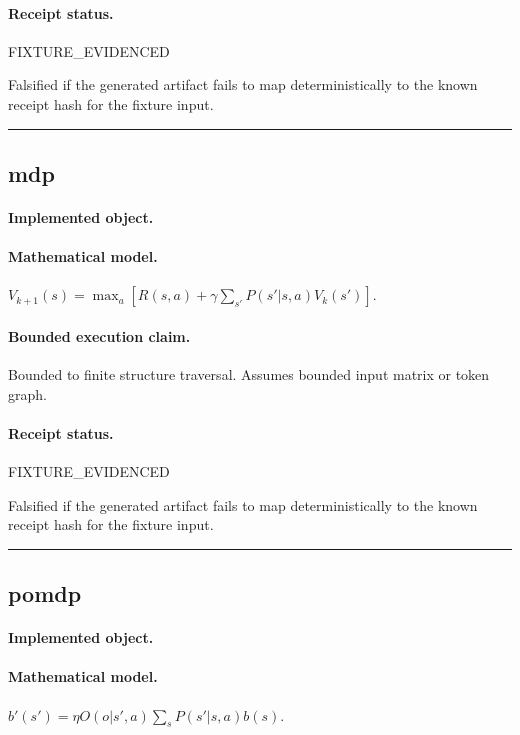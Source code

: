 \paragraph{Receipt status.} FIXTURE\_EVIDENCED
\begin{falsifier}
Falsified if the generated artifact fails to map deterministically to the known receipt hash for the fixture input.
\end{falsifier}

\vspace{1em}\hrule\vspace{1em}
\subsection{mdp}
\paragraph{Implemented object.} 
\paragraph{Mathematical model.} $V_{k+1}(s) = \max_a \left[ R(s,a)+\gamma\sum_{s'}P(s'|s,a)V_k(s') \right].$
\paragraph{Bounded execution claim.} Bounded to finite structure traversal. Assumes bounded input matrix or token graph.
\paragraph{Receipt status.} FIXTURE\_EVIDENCED
\begin{falsifier}
Falsified if the generated artifact fails to map deterministically to the known receipt hash for the fixture input.
\end{falsifier}

\vspace{1em}\hrule\vspace{1em}
\subsection{pomdp}
\paragraph{Implemented object.} 
\paragraph{Mathematical model.} $b'(s') = \eta O(o|s',a)\sum_sP(s'|s,a)b(s).$
